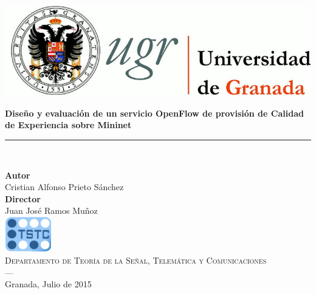 \begin{titlepage}
 
 
\setlength{\centeroffset}{-0.5\oddsidemargin}
\addtolength{\centeroffset}{0.5\evensidemargin}
\thispagestyle{empty}

\noindent\hspace*{\centeroffset}\begin{minipage}{\textwidth}

\centering

% 

 \vspace{3.3cm}

\includegraphics{imagenes/logo_ugr} 
 \vspace{0.5cm}


{\Huge\bfseries Diseño y evaluación de un servicio OpenFlow de provisión de Calidad de Experiencia sobre Mininet\\
}
\noindent\rule[-1ex]{\textwidth}{3pt}\\[3.5ex]
{\large\bfseries}
\end{minipage}

\vspace{2.5cm}
\noindent\hspace*{\centeroffset}\begin{minipage}{\textwidth}
\centering

\textbf{Autor}\\ {Cristian Alfonso Prieto Sánchez}\\[2.5ex]
\textbf{Director}\\
{Juan José Ramos Muñoz}\\[2cm]
\includegraphics[width=0.15\textwidth]{imagenes/tstc}\\[0.1cm]
\textsc{Departamento de Teoría de la Señal, Telemática y Comunicaciones}\\
\textsc{---}\\
Granada, Julio de 2015
\end{minipage}
\addtolength{\textwidth}{\centeroffset}

 
\end{titlepage}


